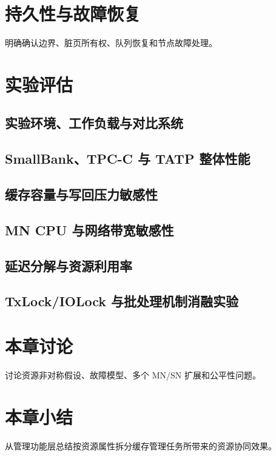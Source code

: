 \section{持久性与故障恢复}
明确确认边界、脏页所有权、队列恢复和节点故障处理。
\section{实验评估}
\subsection{实验环境、工作负载与对比系统}
\subsection{SmallBank、TPC-C 与 TATP 整体性能}
\subsection{缓存容量与写回压力敏感性}
\subsection{MN CPU 与网络带宽敏感性}
\subsection{延迟分解与资源利用率}
\subsection{TxLock/IOLock 与批处理机制消融实验}

\section{本章讨论}
讨论资源非对称假设、故障模型、多个 MN/SN 扩展和公平性问题。
\section{本章小结}
从管理功能层总结按资源属性拆分缓存管理任务所带来的资源协同效果。
